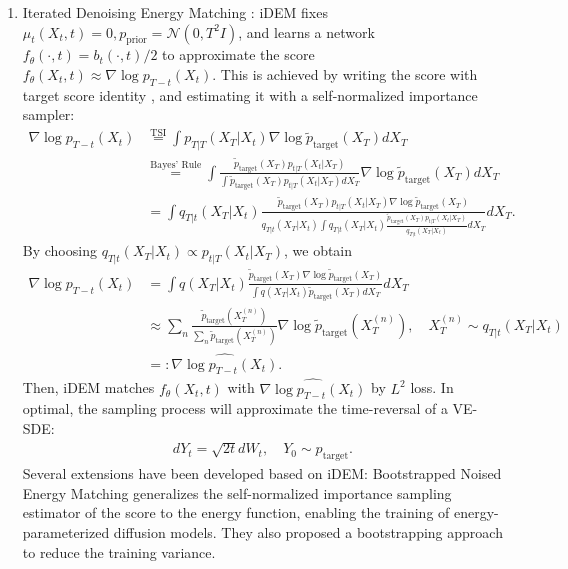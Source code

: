 \documentclass{article} %
\def\ptilde{\tilde{p}_\text{target}}
\begin{document}
\begin{enumerate}[label=({{\arabic*}}), leftmargin=*]
       \item Iterated Denoising Energy Matching \citep[iDEM,][]{akhounditerated}: iDEM fixes $\mu_t(X_t, t) = 0, p_\text{prior} = \mathcal{N}(0, T^2 I)$, and learns a network $f_\theta(\cdot, t) = b_t(\cdot, t) / 2$ to approximate the score  $f_\theta(X_t, t) \approx \nabla \log p_{T-t} (X_t)$.
        This is achieved by writing the score with target score identity \citep[TSI, ][]{de2024target}, and estimating it with a self-normalized importance sampler:
        \begin{align}
            \nabla \log p_{T-t} (X_t) &\stackrel{\text{TSI}}{=} \int p_{T|T}(X_T | X_t)  \nabla \log \ptilde (X_T) dX_T\\
            &\stackrel{\text{Bayes' Rule}}{=}\int \frac{\ptilde (X_T)p_{t|T}(X_t|X_T)}{\int \ptilde (X_T)p_{t|T}(X_t|X_T) dX_T}  \nabla \log \ptilde (X_T) dX_T\\
            &=\int q_{T|t}(X_T | X_t)\frac{\ptilde (X_T)p_{t|T}(X_t|X_T) \nabla \log \ptilde (X_T) }{q_{T|t}(X_T | X_t) \int q_{T|t}(X_T | X_t) \frac{\ptilde (X_T)p_{t|T}(X_t|X_T) }{q_{T|t}(X_T | X_t)}dX_T} dX_T.
        \end{align}
        By choosing $q_{T|t}(X_T | X_t)\propto p_{t|T}(X_t|X_T)$, we obtain
        \begin{align}
            \nabla \log p_{T-t} (X_t) &=\int q(X_T | X_t)\frac{\ptilde (X_T)\nabla \log \ptilde (X_T)}{ \int q(X_T | X_t) \ptilde (X_T)dX_T}   dX_T\\
            &\approx\sum_{n} \frac{\ptilde (X_T^{(n)})}{ \sum_{n}  \ptilde (X_T^{(n)})}\nabla \log \ptilde (X_T^{(n)}), \quad X_T^{(n)}\sim  q_{T|t}(X_T | X_t)\\
            & =: \widehat{\nabla \log p_{T-t} (X_t)}.
        \end{align}
        Then, iDEM matches $f_\theta(X_t, t)$ with $\widehat{\nabla \log p_{T-t} (X_t)}$ by $L^2$ loss.
        In optimal, the sampling process will approximate the time-reversal of a VE-SDE:
         \begin{align}\label{eq:idem_y_appendix}
            dY_t =\sqrt{2t} dW_t, \quad  Y_0 \sim p_\text{target}.
        \end{align}
Several extensions have been developed based on iDEM:
Bootstrapped Noised Energy Matching \citep[BNEM, ][]{ouyang2024bnemboltzmannsamplerbased} generalizes the self-normalized importance sampling estimator of the score to the energy function, enabling the training of energy-parameterized diffusion models.
They also proposed a bootstrapping approach to reduce the training variance.

\end{enumerate}
\end{document}
